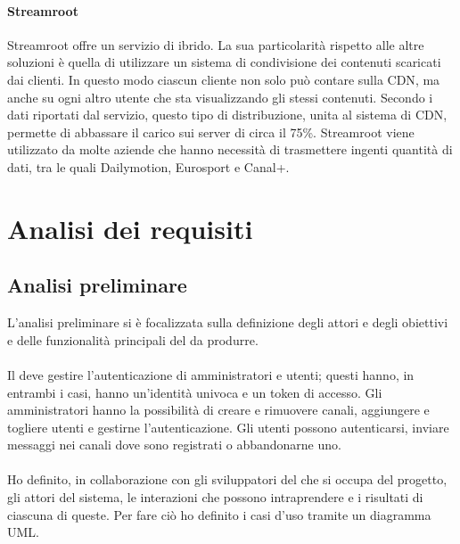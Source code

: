 		\paragraph{Streamroot}
		Streamroot offre un servizio di  ibrido. La sua particolarità rispetto alle altre soluzioni è quella di utilizzare un sistema di condivisione  dei contenuti scaricati dai clienti. In questo modo ciascun cliente non solo può contare sulla \gls{CDN}, ma anche su ogni altro utente che sta visualizzando gli stessi contenuti. Secondo i dati riportati dal servizio, questo tipo di distribuzione, unita al sistema di \gls{CDN}, permette di abbassare il carico sui server di circa il 75\%. Streamroot viene utilizzato da molte aziende che hanno necessità di trasmettere ingenti quantità di dati, tra le quali Dailymotion, Eurosport e Canal+.
	

\section{Analisi dei requisiti}
	\subsection{Analisi preliminare}
		L'analisi preliminare si è focalizzata sulla definizione degli attori e degli obiettivi e delle funzionalità principali del  da produrre.
		\paragraph*{}
		Il  deve gestire l'autenticazione di amministratori e utenti; questi hanno, in entrambi i casi, hanno un'identità univoca e un token di accesso. Gli amministratori hanno la possibilità di creare e rimuovere canali, aggiungere e togliere utenti e gestirne l'autenticazione.
		Gli utenti possono autenticarsi, inviare messaggi nei canali dove sono registrati o abbandonarne uno.
		\paragraph*{}
		Ho definito, in collaborazione con gli sviluppatori del  che si occupa del progetto, gli attori del sistema, le interazioni che possono intraprendere e i risultati di ciascuna di queste. Per fare ciò ho definito i casi d'uso tramite un diagramma \gls{UML}.\@

